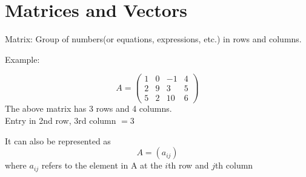 \documentclass{article}
\begin{document}
\section{Matrices and Vectors}
\begin{paragraph}{Matrix:}    
Group of numbers(or equations, expressions, etc.) in rows and columns.
\end{paragraph}
\begin{paragraph}{Example:}

    \[A = \begin{pmatrix}
        1 & 0 & -1 & 4 \\
        2 & 9 & 3 & 5 \\
        5 & 2 & 10 & 6 
    \end{pmatrix}\]
The above matrix has 3 rows and 4 columns.\\[1pt]
Entry in 2nd row, 3rd column $ = 3$

It can also be represented as \[A = (a_{ij})\] 
where $a_{ij}$ refers to the element in A at the $i$th row and $j$th column

\end{paragraph}
\end{document}
